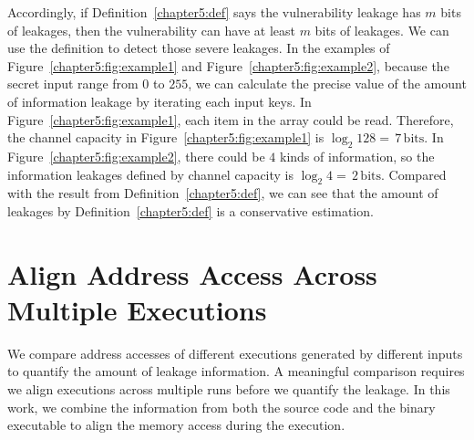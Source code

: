 Accordingly, if Definition~\ref{chapter5:def} says the vulnerability leakage has $m$ bits of leakages, then the vulnerability can have at least $m$ bits of leakages. We can use the definition to detect those severe leakages. In the examples of Figure~\ref{chapter5:fig:example1} and Figure~\ref{chapter5:fig:example2}, because the secret input range from $0$ to $255$, we can calculate the precise value of the amount of information leakage by iterating each input keys. In Figure~\ref{chapter5:fig:example1}, each item in the array could be read. Therefore, the channel capacity in Figure~\ref{chapter5:fig:example1} is $\log_2{128} = \,7\, \mathrm{bits}$. In Figure~\ref{chapter5:fig:example2}, there could be $4$ kinds of information, so the information leakages defined by channel capacity is $\log_2{4} = \,2\, \mathrm{bits}$. Compared with the result from Definition~\ref{chapter5:def}, we can see that the amount of leakages by Definition~\ref{chapter5:def} is a conservative estimation.

\section{Align Address Access Across Multiple Executions}
We compare address accesses of different executions generated by different inputs to quantify the amount of leakage information. A meaningful comparison requires we align executions across multiple runs before we quantify the leakage. In this work, we combine the information from both the source code and the binary executable to align the memory access during the execution.


